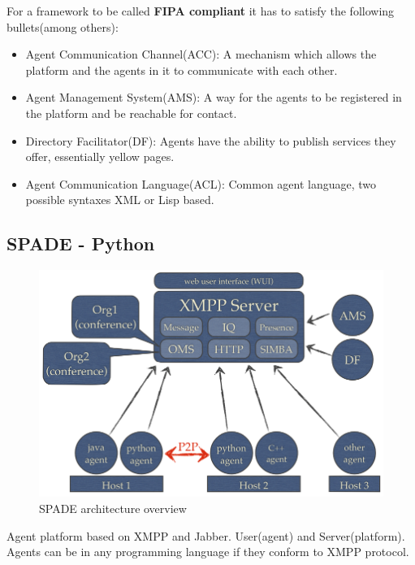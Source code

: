 \documentclass[a4paper, 11pt]{article}
\begin{document}
\noindent For a framework to be called \textbf{FIPA compliant} it has to satisfy the following bullets(among others): 
\begin{itemize}
	\item Agent Communication Channel(ACC): A mechanism which allows the platform and the agents in it to communicate with each other.
	\item Agent Management System(AMS): A way for the agents to be registered in the platform and be reachable for contact.
	\item Directory Facilitator(DF): Agents have the ability to publish services they offer, essentially yellow pages.
	\item Agent Communication Language(ACL): Common agent language, two possible syntaxes XML or Lisp based.
\end{itemize}

\subsection{SPADE - Python}

\begin{figure}[H]
	\caption{SPADE architecture overview}
	\centering
	\includegraphics[scale=0.7]{./images/spade_overview.png}
\end{figure}

Agent platform based on XMPP and Jabber. User(agent) and Server(platform). Agents can be in any programming language if they conform to XMPP protocol.
\end{document}
